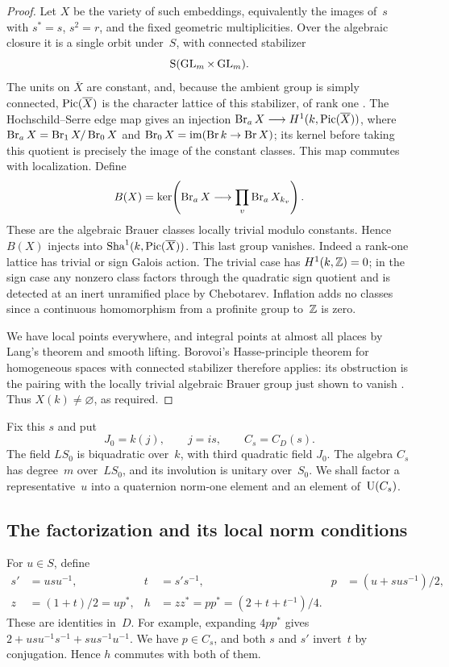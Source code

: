 \begin{proof}
Let $X$ be the variety of such embeddings, equivalently the images
of~$s$ with $s^*=s$, $s^2=r$, and the fixed geometric multiplicities.
Over the algebraic closure it is a single orbit under~$S$, with
connected stabilizer
\[
 \mathrm{S}(\operatorname{GL}_m\times\operatorname{GL}_m).
\]
The units on $\overline X$ are constant, and, because the ambient
group is simply connected, $\operatorname{Pic}(\overline X)$ is the character
lattice of this stabilizer, of rank one
\cite[Proposition~6.10, equation~(6.10.1)]{Sansuc}. The Hochschild--Serre edge
map gives an injection
$\operatorname{Br}_a X\longrightarrow H^1(k,\operatorname{Pic}(\overline X))$, where
$\operatorname{Br}_a X=\operatorname{Br}_1X/\operatorname{Br}_0X$ and $\operatorname{Br}_0X=\operatorname{im}(\operatorname{Br} k\to\operatorname{Br} X)$;
its kernel before taking this quotient
is precisely the image of the constant classes.  This map commutes
with localization. Define
\[
 B(X)=\ker\!\left(\operatorname{Br}_a X\longrightarrow
                       \prod_v\operatorname{Br}_a X_{k_v}\right).
\]
These are the algebraic Brauer classes locally trivial modulo constants.
Hence $B(X)$ injects into
$\operatorname{Sha}^1(k,\operatorname{Pic}(\overline X))$.  This last group vanishes.  Indeed a
rank-one lattice has trivial or sign Galois action.  The trivial case
has $H^1(k,\mathbb Z)=0$; in the sign case any nonzero class factors
through the quadratic sign quotient and is detected at an inert
unramified place by Chebotarev.  Inflation adds no classes since a
continuous homomorphism from a profinite group to~$\mathbb Z$ is zero.

We have local points everywhere, and integral points at almost all
places by Lang's theorem \cite[Theorem~1 and its corollary]{Lang1956}
and smooth lifting. Borovoi's
Hasse-principle theorem for homogeneous spaces with connected
stabilizer therefore applies: its obstruction is the pairing with
the locally trivial algebraic Brauer group just shown to vanish
\cite[Theorem~2.2]{Borovoi}.  Thus $X(k)\ne\varnothing$, as required.
\end{proof}

Fix this $s$ and put
\[
 J_0=k(j),\qquad j=is,\qquad C_s=C_D(s).
\]
The field $LS_0$ is biquadratic over~$k$, with third quadratic field
$J_0$.  The algebra $C_s$ has degree~$m$ over~$LS_0$, and its
involution is unitary over~$S_0$.  We shall factor a representative~$u$
into a quaternion norm-one element and an element of~$\operatorname{U}(C_s)$.

\subsection{The factorization and its local norm conditions}

For $u\in S$, define
\begin{equation}\label{eq:unitary-factor-data}
 \begin{aligned}
 s'&=usu^{-1},& t&=s's^{-1},&
 p&=(u+sus^{-1})/2,\\
 z&=(1+t)/2=up^*,&
 h&=zz^*=pp^*=(2+t+t^{-1})/4.
 \end{aligned}
\end{equation}
These are identities in~$D$.  For example, expanding $4pp^*$ gives
$2+usu^{-1}s^{-1}+sus^{-1}u^{-1}$.  We have $p\in C_s$, and both $s$
and $s'$ invert~$t$ by conjugation.  Hence $h$ commutes with both of
them.

